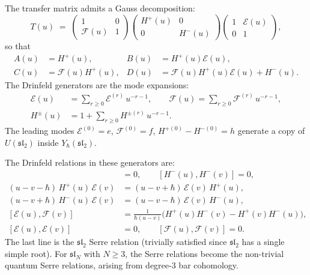 \begin{construction}
\label{constr:gauss-sl2}
The transfer matrix admits a Gauss decomposition:
\begin{equation}\label{eq:gauss-sl2}
T(u)\;=\;
\begin{pmatrix}1&0\\\mathcal{F}(u)&1\end{pmatrix}
\begin{pmatrix}H^+(u)&0\\0&H^-(u)\end{pmatrix}
\begin{pmatrix}1&\mathcal{E}(u)\\0&1\end{pmatrix},
\end{equation}
so that
\begin{align*}
A(u)&=H^+(u),&
B(u)&=H^+(u)\mathcal{E}(u),\\
C(u)&=\mathcal{F}(u)H^+(u),&
D(u)&=\mathcal{F}(u)H^+(u)\mathcal{E}(u)+H^-(u).
\end{align*}
The Drinfeld generators are the mode expansions:
\begin{align}
\mathcal{E}(u)&=\sum_{r\ge 0}\mathcal{E}^{(r)}\,u^{-r-1},\qquad
\mathcal{F}(u)=\sum_{r\ge 0}\mathcal{F}^{(r)}\,u^{-r-1},\label{eq:drinfeld-EF-sl2}\\
H^\pm(u)&=1+\sum_{r\ge 0}H^{\pm(r)}\,u^{-r-1}.\label{eq:drinfeld-H-sl2}
\end{align}
The leading modes $\mathcal{E}^{(0)}=e$, $\mathcal{F}^{(0)}=f$,
$H^{+(0)}-H^{-(0)}=h$ generate a copy of $U(\mathfrak{sl}_2)$ inside
$Y_\hbar(\mathfrak{sl}_2)$.
\end{construction}

The Drinfeld relations in these generators are:
\begin{align}
[H^+(u),H^+(v)]&=0,\qquad [H^-(u),H^-(v)]=0,
\label{eq:drinfeld-HH-sl2}\\
(u-v-\hbar)\,H^+(u)\,\mathcal{E}(v)&=(u-v+\hbar)\,\mathcal{E}(v)\,H^+(u),
\label{eq:drinfeld-HE-sl2}\\
(u-v+\hbar)\,H^-(u)\,\mathcal{E}(v)&=(u-v-\hbar)\,\mathcal{E}(v)\,H^-(u),
\label{eq:drinfeld-HmE-sl2}\\
[\mathcal{E}(u),\mathcal{F}(v)]
&=\frac{1}{\hbar(u-v)}\bigl(H^+(u)H^-(v)-H^+(v)H^-(u)\bigr),
\label{eq:drinfeld-EF-rel-sl2}\\
[\mathcal{E}(u),\mathcal{E}(v)]&=0,\qquad [\mathcal{F}(u),\mathcal{F}(v)]=0.
\label{eq:drinfeld-serre-sl2}
\end{align}
The last line is the $\mathfrak{sl}_2$ Serre relation (trivially
satisfied since $\mathfrak{sl}_2$ has a single simple root). For
$\mathfrak{sl}_N$ with $N\ge 3$, the Serre relations become the
non-trivial quantum Serre relations, arising from degree-$3$ bar
cohomology.

